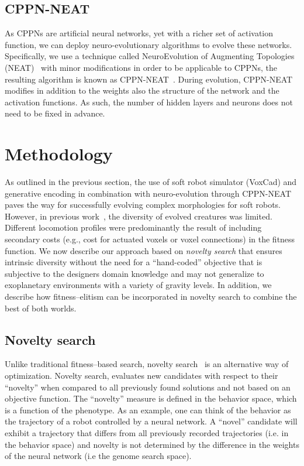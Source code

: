\documentclass{sig-alternate}
\begin{document}
\subsection{CPPN-NEAT}
As CPPNs are artificial neural networks, yet with a richer set of activation function, we can deploy neuro-evolutionary algorithms to evolve these networks. Specifically, we use a technique called NeuroEvolution of Augmenting Topologies (NEAT)~\cite{stanley2002evolving} with minor modifications in order to be applicable to CPPNs, the resulting algorithm is known as CPPN-NEAT~\cite{stanley2007compositional}. During evolution, CPPN-NEAT modifies in addition to the weights also the structure of the network and the activation functions. As such, the number of hidden layers and neurons does not need to be fixed in advance.

\section{Methodology}
As outlined in the previous section, the use of soft robot simulator (VoxCad) and generative encoding in combination with neuro-evolution through CPPN-NEAT paves the way for successfully evolving complex morphologies for soft robots. However, in previous work~\cite{cheney2013unshackling}, the diversity of evolved creatures was limited. Different locomotion profiles were predominantly the result of including secondary costs (e.g., cost for actuated voxels or voxel connections) in the fitness function. We now describe our approach based on \textit{novelty search} that ensures intrinsic diversity without the need for a ``hand-coded'' objective that is subjective to the designers domain knowledge and may not generalize to exoplanetary environments with a variety of gravity levels. In addition, we describe how fitness--elitism can be incorporated in novelty search to combine the best of both worlds.

\subsection{Novelty search}

Unlike traditional fitness--based search, novelty search~\cite{lehman2008exploiting,lehman2011abandoning,lehman2010revising, risi2009novelty} is an alternative way of optimization. Novelty search, evaluates new candidates with respect to their ``novelty'' when compared to all previously found solutions and not based on an objective function. The ``novelty'' measure is defined in the behavior space, which is a function of the phenotype. As an example, one can think of the behavior as the trajectory of a robot controlled by a neural network. A ``novel'' candidate will exhibit a trajectory that differs from all previously recorded trajectories (i.e. in the behavior space) and novelty is not determined by the difference in the weights of the neural network (i.e the genome search space).
\end{document}
